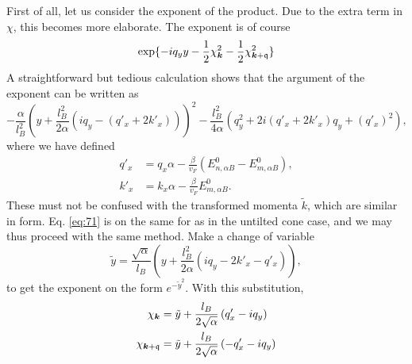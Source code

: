 First of all, let us consider the exponent of the product.
Due to the extra term in \(\chi\), this becomes more elaborate.
The exponent is of course
\begin{equation}
  \label{eq:70}
  \exp\{-i q_{y} y - \frac{1}{2} \chi_{\bm{k}} ^2 - \frac{1}{2} \chi _{\bm{k} + \mathfrak{q}}^2\}
\end{equation}
A straightforward but tedious calculation shows that the argument of the exponent can be written as
\begin{equation}
  \label{eq:71}
  -\frac{\alpha}{l_{B}^2} \left(y + \frac{l_{B}^2}{2 \alpha } (i q_{y} - (q'_x + 2 k'_x))\right)^2
  -\frac{l_{B}^2}{4 \alpha } (q_{y}^2 + 2i (q'_x + 2 k'_x) q_{y} + ( q' _{x} )^2 ),
\end{equation}
where we have defined
\begin{align}
  \label{eq:qkprime}
  q' _x &= q_x \alpha  - \frac{\beta}{v_{F} }( E^0_{n,\alpha B} - E^0_{m, \alpha B} ),\\
  k' _x &= k_x\alpha - \frac{\beta}{v_F } E^0_{m, \alpha B}.
\end{align}
These must not be confused with the transformed momenta \( \tilde{k} \), which are similar in form.
Eq. \eqref{eq:71} is on the same for as in the untilted cone case, and we may thus proceed with the same method.
Make a change of variable
\[
\tilde{y} = \frac{\sqrt{\alpha }}{l_{B}} \left(y + \frac{l_{B}^2}{2\alpha } (iq_{y} - 2 k' _x - q' _x )\right),
\]
to get the exponent on the form \(e^{-\tilde{y}^2}\).
With this substitution,
\begin{align}
  \chi _{\bm{k}} &= \tilde{y} + \frac{l_{B}}{2 \sqrt{\alpha }} \left(q' _x - i q_{y}\right)\\
  \chi _{\bm{k} + \mathfrak{q}} &= \tilde{y} + \frac{l_{B}}{2 \sqrt{\alpha }} \left(- q' _x - i q_{y}\right)
\end{align}

